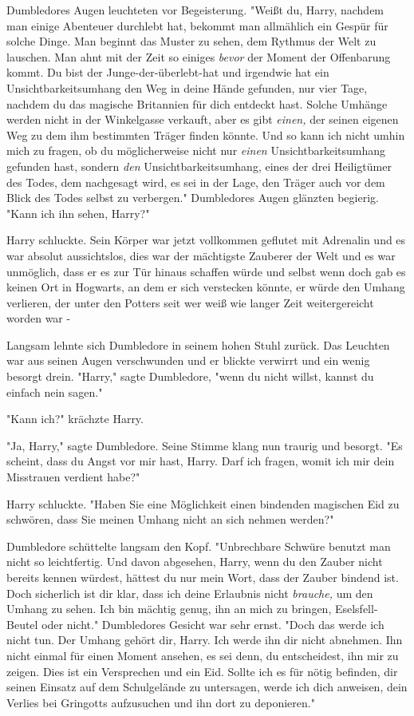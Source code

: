 {Dumbledores Augen leuchteten vor Begeisterung. "Weißt du, Harry, nachdem man einige Abenteuer durchlebt hat, bekommt man allmählich ein Gespür für solche Dinge. Man beginnt das Muster zu sehen, dem Rythmus der Welt zu lauschen. Man ahnt mit der Zeit so einiges \emph{bevor} der Moment der Offenbarung kommt. Du bist der Junge-der-überlebt-hat und irgendwie hat ein Unsichtbarkeitsumhang den Weg in deine Hände gefunden, nur vier Tage, nachdem du das magische Britannien für dich entdeckt hast. Solche Umhänge werden nicht in der Winkelgasse verkauft, aber es gibt \emph{einen,} der seinen eigenen Weg zu dem ihm bestimmten Träger finden könnte. Und so kann ich nicht umhin mich zu fragen, ob du möglicherweise nicht nur \emph{einen} Unsichtbarkeitsumhang gefunden hast, sondern \emph{den} Unsichtbarkeitsumhang, eines der drei Heiligtümer des Todes, dem nachgesagt wird, es sei in der Lage, den Träger auch vor dem Blick des Todes selbst zu verbergen." Dumbledores Augen glänzten begierig. "Kann ich ihn sehen, Harry?"

Harry schluckte. Sein Körper war jetzt vollkommen geflutet mit Adrenalin und es war absolut aussichtslos, dies war der mächtigste Zauberer der Welt und es war unmöglich, dass er es zur Tür hinaus schaffen würde und selbst wenn doch gab es keinen Ort in Hogwarts, an dem er sich verstecken könnte, er würde den Umhang verlieren, der unter den Potters seit wer weiß wie langer Zeit weitergereicht worden war -

Langsam lehnte sich Dumbledore in seinem hohen Stuhl zurück. Das Leuchten war aus seinen Augen verschwunden und er blickte verwirrt und ein wenig besorgt drein. "Harry," sagte Dumbledore, "wenn du nicht willst, kannst du einfach nein sagen."

"Kann ich?" krächzte Harry.

"Ja, Harry," sagte Dumbledore. Seine Stimme klang nun traurig und besorgt. "Es scheint, dass du Angst vor mir hast, Harry. Darf ich fragen, womit ich mir dein Misstrauen verdient habe?"

Harry schluckte. "Haben Sie eine Möglichkeit einen bindenden magischen Eid zu schwören, dass Sie meinen Umhang nicht an sich nehmen werden?"

Dumbledore schüttelte langsam den Kopf. "Unbrechbare Schwüre benutzt man nicht so leichtfertig. Und davon abgesehen, Harry, wenn du den Zauber nicht bereits kennen würdest, hättest du nur mein Wort, dass der Zauber bindend ist. Doch sicherlich ist dir klar, dass ich deine Erlaubnis nicht \emph{brauche,} um den Umhang zu sehen. Ich bin mächtig genug, ihn an mich zu bringen, Eselsfell-Beutel oder nicht." Dumbledores Gesicht war sehr ernst. "Doch das werde ich nicht tun. Der Umhang gehört dir, Harry. Ich werde ihn dir nicht abnehmen. Ihn nicht einmal für einen Moment ansehen, es sei denn, du entscheidest, ihn mir zu zeigen. Dies ist ein Versprechen und ein Eid. Sollte ich es für nötig befinden, dir seinen Einsatz auf dem Schulgelände zu untersagen, werde ich dich anweisen, dein Verlies bei Gringotts aufzusuchen und ihn dort zu deponieren."

}
